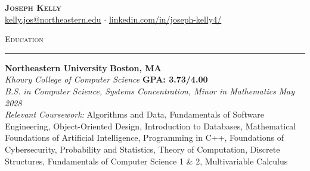 \documentclass[letterpaper,10pt]{article}
\newcommand{\header}[1]{\par\vspace{6pt}\textsc{#1}\par\nobreak\vspace{1pt}\hrule\vspace{4pt}}
\begin{document}
\begin{center}
  {\huge\textbf{\scshape Joseph Kelly}}\\[2pt]
  \href{mailto:kelly.jos@northeastern.edu}{kelly.jos@northeastern.edu} $\cdot$
  \href{https://linkedin.com/in/joseph-kelly4/}{linkedin.com/in/joseph-kelly4/}
\end{center}
\vspace{-9pt}

\header{Education}
\textbf{Northeastern University} \hfill \textbf{Boston, MA} \\
\vspace{0.5mm}
\textit{Khoury College of Computer Science} \hfill \textbf{GPA: 3.73/4.00} \\
\textit{B.S. in Computer Science, Systems Concentration, Minor in Mathematics}
\hfill \textit{May 2028} \\[2pt]
\textit{Relevant Coursework:} Algorithms and Data, Fundamentals of Software Engineering, Object-Oriented Design, Introduction to Databases, Mathematical Foundations of Artificial Intelligence, Programming in C++, Foundations of Cybersecurity, Probability and Statistics, Theory of Computation, Discrete Structures, Fundamentals of Computer Science 1 \& 2, Multivariable Calculus
\end{document}
